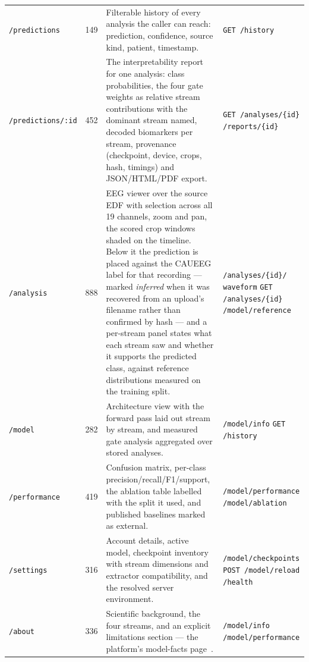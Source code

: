 \documentclass[11pt,a4paper]{article}
\newcommand{\code}[1]{\texttt{#1}}
\begin{document}
\begin{table}[H]
\begin{tabularx}{\linewidth}{@{}L{2.5cm} C{0.7cm} Y L{3.5cm}@{}}
\code{/predictions} & 149 & Filterable history of every analysis the caller can reach: prediction, confidence, source kind, patient, timestamp. & \code{GET /history} \\
\code{/predictions/:id} & 452 & The interpretability report for one analysis: class probabilities, the four gate weights as relative stream contributions with the dominant stream named, decoded biomarkers per stream, provenance (checkpoint, device, crops, hash, timings) and JSON/HTML/PDF export. & \code{GET /analyses/\{id\}} \newline \code{/reports/\{id\}} \\
\code{/analysis} & 888 & EEG viewer over the source EDF with selection across all 19 channels, zoom and pan, the scored crop windows shaded on the timeline. Below it the prediction is placed against the CAUEEG label for that recording --- marked \emph{inferred} when it was recovered from an upload's filename rather than confirmed by hash --- and a per-stream panel states what each stream saw and whether it supports the predicted class, against reference distributions measured on the training split. & \code{/analyses/\{id\}/} \code{waveform} \newline \code{GET /analyses/\{id\}} \newline \code{/model/reference} \\
\code{/model} & 282 & Architecture view with the forward pass laid out stream by stream, and measured gate analysis aggregated over stored analyses. & \code{/model/info} \newline \code{GET /history} \\
\code{/performance} & 419 & Confusion matrix, per-class precision/recall/F1/support, the ablation table labelled with the split it used, and published baselines marked as external. & \code{/model/performance} \newline \code{/model/ablation} \\
\code{/settings} & 316 & Account details, active model, checkpoint inventory with stream dimensions and extractor compatibility, and the resolved server environment. & \code{/model/checkpoints} \newline \code{POST /model/reload} \newline \code{/health} \\
\code{/about} & 336 & Scientific background, the four streams, and an explicit limitations section --- the platform's model-facts page~\cite{sendak2020}. & \code{/model/info} \newline \code{/model/performance} \\
\bottomrule
\end{tabularx}
\end{table}
\end{document}
